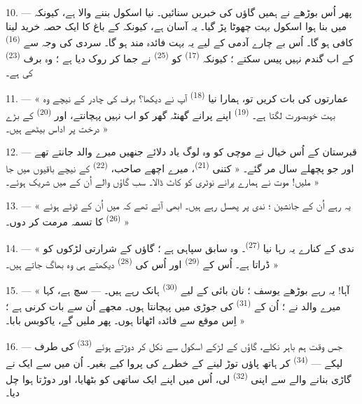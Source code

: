 \VUsaut{3.0mm}
\VUsaut{3.0mm}

10. --- پھر اُس بوڑھے نے ہمیں گاؤں کی خبریں سنائیں۔ نیا اسکول بننے
والا ہے، کیونکہ  میں بنا ہوا اسکول بہت چھوٹا پڑ
گیا۔ یہ آسان ہے، کیونکہ  کے باغ کا ایک حصہ خرید لینا
کافی ہو گا۔ اُس بے چارے آدمی کے لیے یہ بہت فائدہ مند ہو گا۔ سردی کی
وجہ سے  \textsuperscript{(16)} کے  اب گندم
نہیں پیس سکتے ؛ کیونکہ  \textsuperscript{(17)} کو
 \textsuperscript{(25)} نے جما کر روک دیا ہے ؛ وہ برف
 \textsuperscript{(23)} کی ہے۔

11. --- « عمارتوں کی بات کریں تو، ہمارا نیا 
\textsuperscript{(18)} آپ نے دیکھا؟ برف کی چادر کے نیچے وہ بہت
خوبصورت لگتا ہے۔  \textsuperscript{(19)} اپنے پرانے گھنٹہ
گھر کو اب نہیں پہچانتے، اور  \textsuperscript{(20)}
کے بڑے درخت پر اداس بیٹھے ہیں۔ »

12. --- قبرستان کے اُس خیال نے موچی کو وہ لوگ یاد دلائے جنھیں میرے
والد جانتے تھے اور جو پچھلے سال مر گئے۔ « کتنی 
\textsuperscript{(21)}، میرے اچھے صاحب، 
\textsuperscript{(22)} کے نیچے باقیوں میں جا ملیں! موت نے ہمارے پرانے
نوٹری کو کاٹ ڈالا۔ سب گاؤں والے اُن کے  میں شریک
ہوئے۔ »

13. --- « یہ رہے اُن کے جانشین ؛ ندی پر پھسل رہے ہیں۔ ابھی آئے تھے
کہ میں اُن کے ٹوٹے ہوئے  \textsuperscript{(26)}
کا تسمہ مرمت کر دوں۔ »

14. --- « ندی کے کنارے یہ رہا نیا 
\textsuperscript{(27)}۔ وہ سابق سپاہی ہے ؛ گاؤں کے شرارتی لڑکوں کو
ڈراتا ہے۔ اُس کے  \textsuperscript{(29)} اور اُس کی
 \textsuperscript{(28)} دیکھتے ہی وہ بھاگ جاتے
ہیں۔ »

15. --- « آہا! یہ رہے بوڑھے یوسف ؛ نان بائی کے لیے  \textsuperscript{(30)} ہانک رہے ہیں۔ --- سچ ہے،
کہا میرے والد نے ؛ اُن کے  \textsuperscript{(31)} کی
جوڑی میں پہچانتا ہوں۔ مجھے اُن سے بات کرنی ہے ؛ اِس موقع سے فائدہ
اٹھاتا ہوں۔ پھر ملیں گے، یاکوبس بابا۔ »

16. --- جس وقت ہم باہر نکلے، گاؤں کے لڑکے اسکول سے نکل کر دوڑتے ہوئے
 \textsuperscript{(33)} کی طرف لپکے — 
\textsuperscript{(34)} کر ہاتھ پاؤں توڑ لینے کے خطرے کی پروا کیے
بغیر۔ اُن میں سے ایک نے گاڑی بنانے والے سے اپنی 
\textsuperscript{(32)} لی، اُس میں اپنے ایک ساتھی کو بٹھایا، اور
دوڑتا ہوا چل دیا۔

